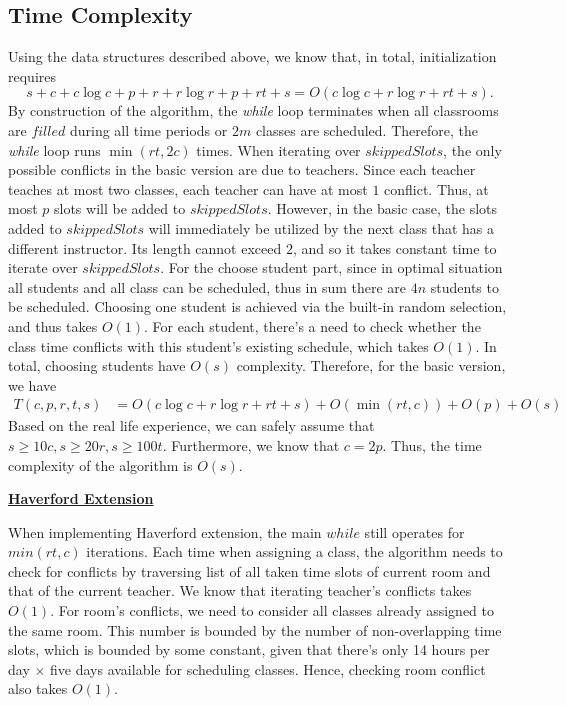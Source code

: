 \documentclass[11pt, oneside]{article}   	%
\begin{document}
\subsection{Time Complexity} 
Using the data structures described above, we know that, in total, initialization requires \[s+c+c\log c+p+r+r\log r+p+rt+s = O(c\log c+r\log r +rt+s).\] By construction of the algorithm, the {\it while} loop terminates when all classrooms are $filled$ during all time periods or $2m$ classes are scheduled. Therefore, the {\it while} loop runs $\min(rt, 2c)$ times. When iterating over $skippedSlots$, the only possible conflicts in the basic version are due to teachers. Since each teacher teaches at most two classes, each teacher can have at most $1$ conflict. Thus, at most $p$ slots will be added to $skippedSlots$. However, in the basic case, the slots added to $skippedSlots$ will immediately be utilized by the next class that has a different instructor. Its length cannot exceed $2$, and so it takes constant time to iterate over $skippedSlots$. For the choose student part, since in optimal situation all students and all class can be scheduled, thus in sum there are $4n$ students to be scheduled. Choosing one student is achieved via the built-in random selection, and thus takes $O(1)$. For each student, there's a need to check whether the class time conflicts with this student's existing schedule, which takes $O(1)$. In total, choosing students have $O(s)$ complexity. Therefore, for the basic version, we have 
\begin{align*}
T(c, p, r, t, s) &= O(c\log c+r\log r +rt+s)+O(\min(rt, c))+O(p)+ O(s)
\end{align*}
Based on the real life experience, we can safely assume that $s\geq 10c, s\geq 20r, s\geq 100t$. Furthermore, we know that $c=2p$. Thus, the time complexity of the algorithm is $O(s)$.\par
\underline {\textbf{Haverford Extension}}\par
When implementing Haverford extension, the main $while$ still operates for $min(rt, c)$ iterations. Each time when assigning a class, the algorithm needs to check for conflicts by traversing list of all taken time slots of current room and that of the current teacher. We know that iterating teacher's conflicts takes $O(1)$. For room's conflicts, we need to consider all classes already assigned to the same room. This number is bounded by the number of non-overlapping time slots, which is bounded by some constant, given that there's only 14 hours per day $\times$ five days available for scheduling classes. Hence, checking room conflict also takes $O(1)$.\par
\end{document}
